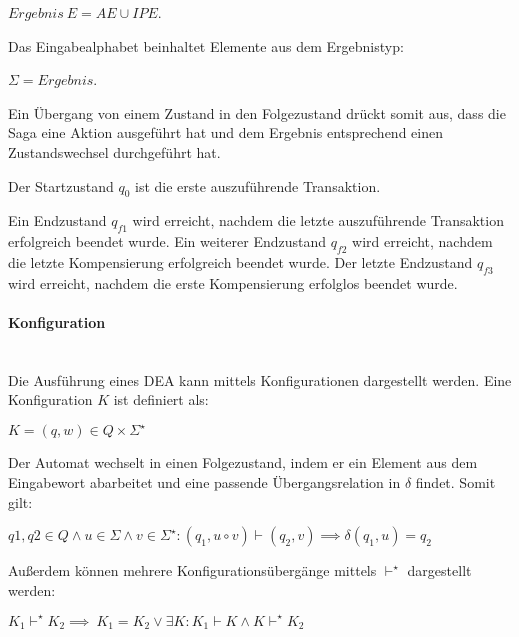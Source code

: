 \begin{center}
	$Ergebnis\ E = AE \cup IPE$.
\end{center}

Das Eingabealphabet beinhaltet Elemente aus dem Ergebnistyp: 

\begin{center}
	$\Sigma = Ergebnis$.
\end{center}

Ein Übergang von einem Zustand in den Folgezustand drückt somit aus, dass die Saga eine Aktion ausgeführt hat und dem Ergebnis entsprechend einen Zustandswechsel durchgeführt hat. 

Der Startzustand $q_0$ ist die erste auszuführende Transaktion. 

Ein Endzustand $q_{f1}$ wird erreicht, nachdem die letzte auszuführende Transaktion erfolgreich beendet wurde. Ein weiterer Endzustand $q_{f2}$ wird erreicht, nachdem die letzte Kompensierung erfolgreich beendet wurde. Der letzte Endzustand $q_{f3}$ wird erreicht, nachdem die erste Kompensierung erfolglos beendet wurde.

\paragraph*{Konfiguration}\mbox{}\\
Die Ausführung eines DEA kann mittels Konfigurationen dargestellt werden. Eine Konfiguration $K$ ist definiert als: 

\begin{center}
	$K = (q, w) \in Q \times \Sigma^{\star}$
\end{center}

Der Automat wechselt in einen Folgezustand, indem er ein Element aus dem Eingabewort abarbeitet und eine passende Übergangsrelation in $\delta$ findet. Somit gilt:

\begin{center}
	$q1, q2 \in Q \land u \in \Sigma \land v \in \Sigma^{\star}: (q_{1}, u \circ v)\vdash (q_{2}, v) \implies \delta(q_{1}, u) = q_{2}$
\end{center}

Außerdem können mehrere Konfigurationsübergänge mittels $\vdash^{\star}$ dargestellt werden:

\begin{center}
	$K_1 \vdash^{\star} K_2 \implies \ K_1 = K_2 \lor \exists K: K_1 \vdash K \land K \vdash^{\star} K_2$
\end{center}

